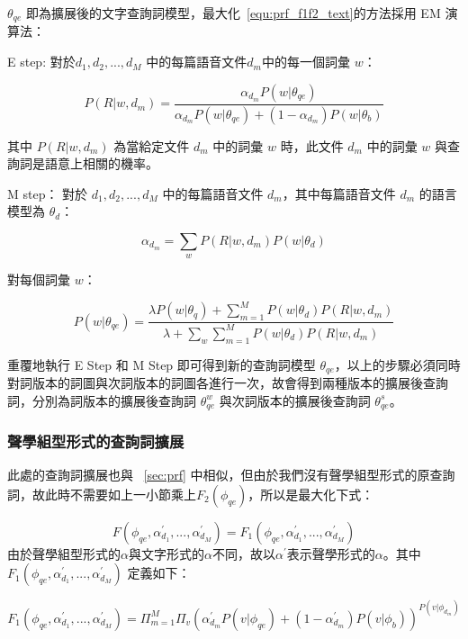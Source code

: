 $\theta_{qe}$ 即為擴展後的文字查詢詞模型，最大化~\ref{equ:prf_f1f2_text}的方法採用 EM 演算法：

E step: 對於${d_1, d_2, ..., d_M}$ 中的每篇語音文件$d_m$中的每一個詞彙 $w$：

\begin{equation}
\label{equ:prf_estep}
P(R|w, d_m) = \frac{\alpha_{d_m} P(w|\theta_{qe})}{\alpha_{d_m} P(w|\theta_{qe}) + (1-\alpha_{d_m}) P(w|\theta_b)}
\end{equation}

其中 $P(R|w, d_m)$ 為當給定文件 $d_m$ 中的詞彙 $w$ 時，此文件 $d_m$ 中的詞彙 $w$ 與查詢詞是語意上相關的機率。 

M step： 對於 ${d_1, d_2, ..., d_M}$ 中的每篇語音文件 $d_m$，其中每篇語音文件 $d_m$ 的語言模型為 $\theta_d$：

\begin{equation}
\label{equ:prf_mstep}
\alpha_{d_m} = \sum_w P(R|w, d_m)P(w|\theta_d)
\end{equation}

對每個詞彙 $w$：

\begin{equation}
P(w|\theta_{qe}) = \frac{\lambda P(w|\theta_q)+\sum^M_{m=1} P(w|\theta_d) P(R|w, d_m)}{\lambda + \sum_w \sum^M_{m=1} P(w|\theta_d) P(R|w, d_m)}
\end{equation}

重覆地執行 E Step 和 M Step 即可得到新的查詢詞模型 $\theta_{qe}$，以上的步驟必須同時對詞版本的詞圖與次詞版本的詞圖各進行一次，故會得到兩種版本的擴展後查詢詞，分別為詞版本的擴展後查詢詞 $\theta_{qe}^{w}$ 與次詞版本的擴展後查詢詞 $\theta_{qe}^{s}$。

\subsubsection{聲學組型形式的查詢詞擴展}
此處的查詢詞擴展也與 ~\ref{sec:prf} 中相似，但由於我們沒有聲學組型形式的原查詢詞，故此時不需要如上一小節乘上$F_2(\phi_{qe})$，所以是最大化下式：

\begin{equation}
\label{equ:prf_f1f2_acoustic}
F(\phi_{qe}, \alpha_{d_1}^{'}, ..., \alpha_{d_M}^{'}) = F_1(\phi_{qe}, \alpha_{d_1}^{'}, ..., \alpha_{d_M}^{'})
\end{equation}
由於聲學組型形式的$\alpha$與文字形式的$\alpha$不同，故以$\alpha^{'}$表示聲學形式的$\alpha$。其中 $F_1(\phi_{qe}, \alpha_{d_1}^{'}, ..., \alpha_{d_M}^{'})$ 定義如下：

\begin{equation}
\label{equ:chap3_prf_f1_acoustic}
F_1(\phi_{qe}, \alpha_{d_1}^{'}, ..., \alpha_{d_M}^{'}) = \Pi^M_{m=1} \Pi_v (\alpha_{d_m}^{'} P(v|\phi_{qe}) + (1 - \alpha_{d_m}^{'}) P(v|\phi_b))^{P(v|\phi_{d_m})}
\end{equation}

